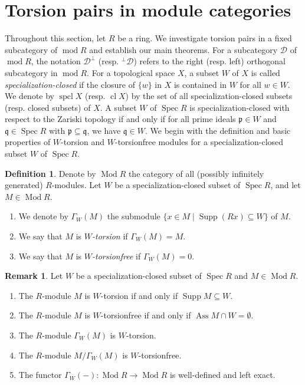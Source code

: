 \documentclass{amsart}
\theoremstyle{definition}
\newtheorem{dfn}[thm]{Definition}
\newtheorem{rem}[thm]{Remark}
\theoremstyle{remark}
\def\Ass{\operatorname{Ass}}
\def\cl{\operatorname{cl}}
\def\D{\mathcal{D}}
\def\mod{\operatorname{mod}}
\def\Mod{\operatorname{Mod}}
\def\p{\mathfrak{p}}
\def\q{\mathfrak{q}}
\def\spcl{\operatorname{spcl}}
\def\Spec{\operatorname{Spec}}
\def\Supp{\operatorname{Supp}}
\begin{document}
\section{Torsion pairs in module categories}

Throughout this section, let $R$ be a ring. We investigate torsion pairs in a fixed subcategory of $\mod R$ and establish our main theorems. For a subcategory $\D$ of $\mod R$, the notation $\D^\perp$ (resp. $^\perp\D$) refers to the right (resp. left) orthogonal subcategory in $\mod R$. For a topological space $X$, a subset $W$ of $X$ is called {\em specialization-closed} if the closure of $\{w\}$ in $X$ is contained in $W$ for all $w\in W$. We denote by $\spcl X$ (resp. $\cl X$) by the set of all specialization-closed subsets (resp. closed subsets) of $X$. A subset $W$ of $\Spec R$ is specialization-closed with respect to the
Zariski topology if and only if for all prime ideals $\p\in W$ and $\q\in\Spec R$
with $\p\subseteq\q$, we have $\q\in W$. We begin with the definition and basic properties of $W$-torsion and $W$-torsionfree modules for a specialization-closed subset $W$ of $\Spec R$.

\begin{dfn}
Denote by $\Mod R$ the category of all (possibly infinitely generated) $R$-modules.
Let $W$ be a specialization-closed subset of $\Spec R$, and let $M\in\Mod R$.
\begin{enumerate}[\rm(1)]
\item
We denote by $\Gamma_W(M)$ the submodule $\{x\in M\mid\Supp(Rx)\subseteq W\}$ of $M$.
\item
We say that $M$ is {\em $W$-torsion} if $\Gamma_W(M)=M$.
\item 
We say that $M$ is {\em $W$-torsionfree} if $\Gamma_W(M)=0$.
\end{enumerate}
\end{dfn}

\begin{rem}\label{rem gamma}
Let $W$ be a specialization-closed subset of $\Spec R$ and $M\in\Mod R$.
\begin{enumerate}[\rm(1)]
\item
The $R$-module $M$ is $W$-torsion if and only if $\Supp M\subseteq W$.
\item
The $R$-module $M$ is $W$-torsionfree if and only if $\Ass M\cap W=\emptyset$.
\item
The $R$-module $\Gamma_W(M)$ is $W$-torsion.
\item
The $R$-module $M/\Gamma_W(M)$ is $W$-torsionfree.
\item 
The functor $\Gamma_W(-):\Mod R\to\Mod R$ is well-defined and left exact.
\end{enumerate}
\end{rem}
\end{document}
